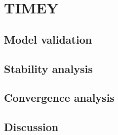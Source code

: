 \section{TIMEY}



%
%
%


\subsection{Model validation}

\subsection{Stability analysis}


\subsection{Convergence analysis}

\subsection{Discussion}
